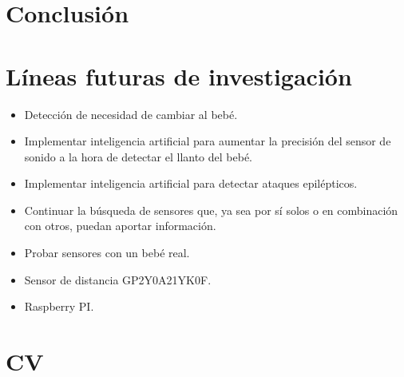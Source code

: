 \documentclass{IEEEtran}
\begin{document}
	\section{Conclusión}


	\section{Líneas futuras de investigación}

		\begin{itemize}
			\item Detección de necesidad de cambiar al bebé.
			\item Implementar inteligencia artificial para aumentar la precisión del sensor de sonido a la hora de detectar el llanto del bebé.
			\item Implementar inteligencia artificial para detectar ataques epilépticos.
			\item Continuar la búsqueda de sensores que, ya sea por sí solos o en combinación con otros, puedan aportar información.
			\item Probar sensores con un bebé real.
			\item Sensor de distancia GP2Y0A21YK0F.
			\item Raspberry PI.
		\end{itemize}

	\section{CV}
\end{document}
